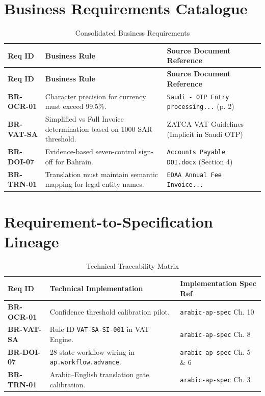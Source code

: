 \documentclass[11pt,a4paper,twoside]{report}
\begin{document}
\chapter{Business Requirements Catalogue}
\label{ch:requirements}

\begin{longtable}{p{2cm} p{5cm} p{7cm}}
\caption{Consolidated Business Requirements} \\
\toprule
\textbf{Req ID} & \textbf{Business Rule} & \textbf{Source Document Reference} \\
\midrule
\endfirsthead
\toprule
\textbf{Req ID} & \textbf{Business Rule} & \textbf{Source Document Reference} \\
\midrule
\endhead
\rowcolor{sapblue!5}
\textbf{BR-OCR-01} & Character precision for currency must exceed 99.5\%. & \texttt{Saudi - OTP Entry processing...} (p. 2) \\
\textbf{BR-VAT-SA} & Simplified vs Full Invoice determination based on 1000 SAR threshold. & ZATCA VAT Guidelines (Implicit in Saudi OTP) \\
\rowcolor{sapblue!5}
\textbf{BR-DOI-07} & Evidence-based seven-control sign-off for Bahrain. & \texttt{Accounts Payable DOI.docx} (Section 4) \\
\textbf{BR-TRN-01} & Translation must maintain semantic mapping for legal entity names. & \texttt{EDAA Annual Fee Invoice...} \\
\bottomrule
\end{longtable}

\chapter{Requirement-to-Specification Lineage}
\label{ch:lineage}

\begin{longtable}{p{2cm} p{6cm} p{6cm}}
\caption{Technical Traceability Matrix} \\
\toprule
\textbf{Req ID} & \textbf{Technical Implementation} & \textbf{Implementation Spec Ref} \\
\midrule
\rowcolor{sapamber!5}
\textbf{BR-OCR-01} & Confidence threshold calibration pilot. & \texttt{arabic-ap-spec} Ch. 10 \\
\textbf{BR-VAT-SA} & Rule ID \texttt{VAT-SA-SI-001} in VAT Engine. & \texttt{arabic-ap-spec} Ch. 8 \\
\rowcolor{sapamber!5}
\textbf{BR-DOI-07} & 28-state workflow wiring in \texttt{ap.workflow.advance}. & \texttt{arabic-ap-spec} Ch. 5 \& 6 \\
\textbf{BR-TRN-01} & Arabic--English translation gate calibration. & \texttt{arabic-ap-spec} Ch. 3 \\
\bottomrule
\end{longtable}
\end{document}
